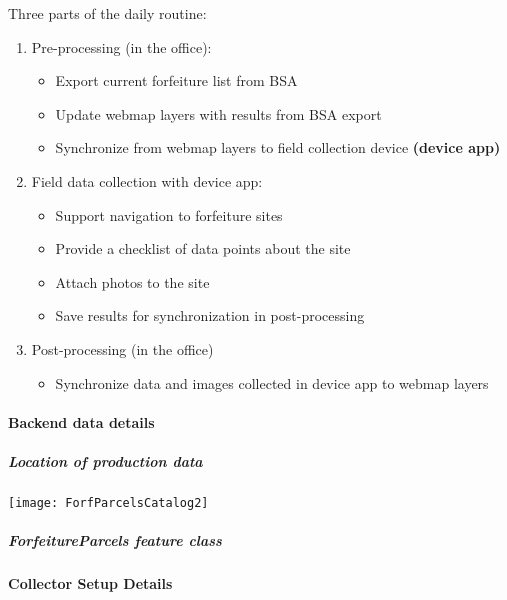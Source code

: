 \documentclass[class=article , crop=false, titlepage, twoside, multi={itemize, figure, verbatim}, float=false]{standalone}
\begin{document}
Three parts of the daily routine:
\begin{enumerate}
\item Pre-processing (in the office):

\begin{itemize}
\item Export current forfeiture list from BSA
\item Update webmap layers with results from BSA export
\item Synchronize from webmap layers to field collection device \textbf{(device app)}
\end{itemize}

\item Field data collection with device app:

\begin{itemize}
\item Support navigation to forfeiture sites
\item Provide a checklist of data points about the site
\item Attach photos to the site
\item Save results for synchronization in post-processing
\end{itemize}

\item Post-processing (in the office)

\begin{itemize}
\item Synchronize data and images collected in device app to webmap layers

\end{itemize}
\end{enumerate}

\paragraph{Backend data details}
\subparagraph{Location of production data}

\begin{center}
    \texttt{[image: ForfParcelsCatalog2]}
    \label{img:g}
\end{center}

\subparagraph{ForfeitureParcels feature class}



\paragraph{Collector Setup Details}
\end{document}

